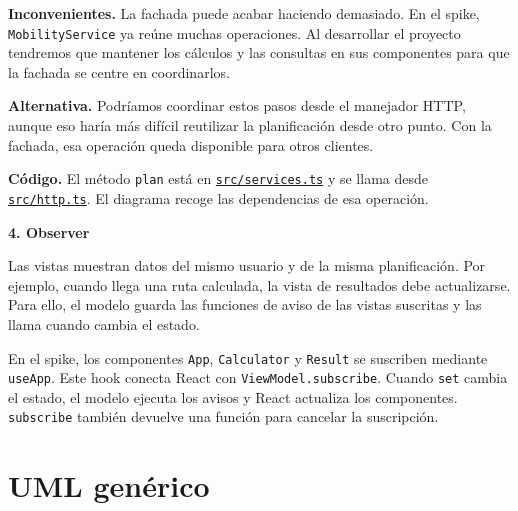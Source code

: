 \documentclass[10pt,a4paper]{article}
\newcommand{\titulo}[2]{{\LARGE\bfseries #1. #2}\par}
\newcommand{\apartado}[1]{\section*{\large #1}}
\newcommand{\fuente}[2]{\href{https://github.com/Kiliansito/ei1039-ei1048-movilidad/blob/dce2b57/entrega1/02_Spike/#1}{\texttt{\small #2}}}
\begin{document}
\textbf{Inconvenientes.} La fachada puede acabar haciendo demasiado. En el spike, \texttt{MobilityService} ya reúne muchas operaciones. Al desarrollar el proyecto tendremos que mantener los cálculos y las consultas en sus componentes para que la fachada se centre en coordinarlos.

\textbf{Alternativa.} Podríamos coordinar estos pasos desde el manejador HTTP, aunque eso haría más difícil reutilizar la planificación desde otro punto. Con la fachada, esa operación queda disponible para otros clientes.

\textbf{Código.} El método \texttt{plan} está en \fuente{src/services.ts}{src/services.ts} y se llama desde \fuente{src/http.ts}{src/http.ts}. El diagrama recoge las dependencias de esa operación.

\newpage
\titulo{4}{Observer}
Las vistas muestran datos del mismo usuario y de la misma planificación. Por ejemplo, cuando llega una ruta calculada, la vista de resultados debe actualizarse. Para ello, el modelo guarda las funciones de aviso de las vistas suscritas y las llama cuando cambia el estado.

En el spike, los componentes \texttt{App}, \texttt{Calculator} y \texttt{Result} se suscriben mediante \texttt{useApp}. Este hook conecta React con \texttt{ViewModel.subscribe}. Cuando \texttt{set} cambia el estado, el modelo ejecuta los avisos y React actualiza los componentes. \texttt{subscribe} también devuelve una función para cancelar la suscripción.

\apartado{UML genérico}
\begin{center}\end{center}
\end{document}

